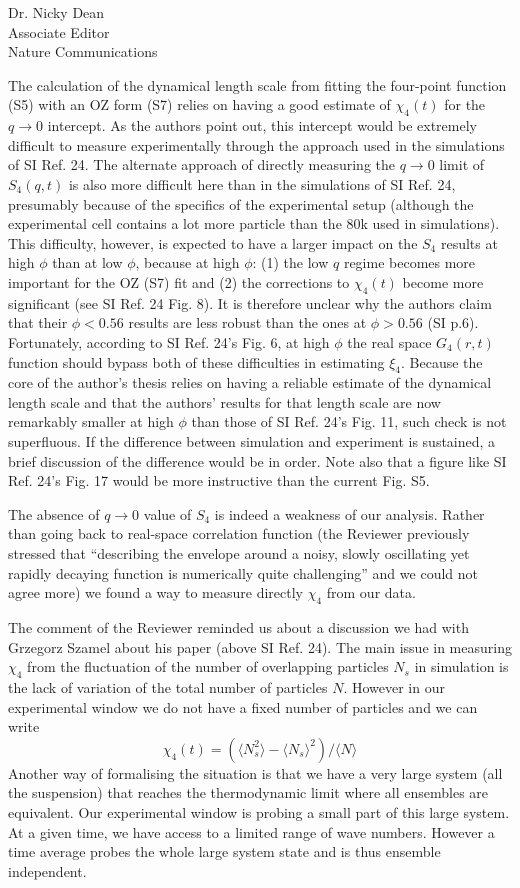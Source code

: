 \documentclass[a4paper, rebuttal, parskip=true, firsthead=false, fromemail=true, foldmarks=false]{scrlttr2}
\begin{document}
\begin{letter}{Dr. Nicky Dean\\
Associate Editor\\
Nature Communications}
\begin{quotationi}
The calculation of the dynamical length scale from fitting the four-point function (S5) with an OZ form (S7) relies on having a good estimate of $\chi_4(t)$ for the $q\rightarrow 0$ intercept. As the authors point out, this intercept would be extremely difficult to measure experimentally through the approach used in the simulations of SI Ref. 24. The alternate approach of directly measuring the $q\rightarrow 0$ limit of $S_4(q,t)$ is also more difficult here than in the simulations of SI Ref. 24, presumably because of the specifics of the experimental setup (although the experimental cell contains a lot more particle than the 80k used in simulations). This difficulty, however, is expected to have a larger impact on the $S_4$ results at high $\phi$ than at low $\phi$, because at high $\phi$: (1) the low $q$ regime becomes more important for the OZ (S7) fit and (2) the corrections to $\chi_4(t)$ become more significant (see SI Ref. 24 Fig. 8). It is therefore unclear why the authors claim that their $\phi<0.56$ results are less robust than the ones at $\phi>0.56$ (SI p.6). Fortunately, according to SI Ref. 24's Fig. 6, at high $\phi$ the real space $G_4(r,t)$ function should bypass both of these difficulties in estimating $\xi_4$. Because the core of the author's thesis relies on having a reliable estimate of the dynamical length scale and that the authors' results for that length scale are now remarkably smaller at high $\phi$ than those of SI Ref. 24's Fig. 11, such check is not superfluous. If the difference between simulation and experiment is sustained, a brief discussion of the difference would be in order. Note also that a figure like SI Ref. 24's Fig. 17 would be more instructive than the current Fig. S5.
\end{quotationi}

The absence of $q\rightarrow 0$ value of $S_4$ is indeed a weakness of our analysis. Rather than going back to real-space correlation function (the Reviewer previously stressed that ``describing the envelope around a noisy, slowly oscillating yet rapidly decaying function is numerically quite challenging'' and we could not agree more) we found a way to measure directly $\chi_4$ from our data.

The comment of the Reviewer reminded us about a discussion we had with Grzegorz Szamel about his paper (above SI Ref. 24). The main issue in measuring $\chi_4$ from the fluctuation of the number of overlapping particles $N_s$ in simulation is the lack of variation of the total number of particles $N$. However in our experimental window we do not have a fixed number of particles and we can write
\[
\chi_4(t) = (\langle N_s^2\rangle - \langle N_s\rangle^2) /  \langle N\rangle
\]
Another way of formalising the situation is that we have a very large system (all the suspension) that reaches the thermodynamic limit where all ensembles are equivalent. Our experimental window is probing a small part of this large system. At a given time, we have access to a limited range of wave numbers. However a time average probes the whole large system state and is thus ensemble independent.


\end{letter}
\end{document}
